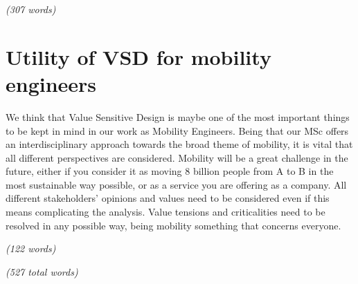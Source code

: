 \emph{(307 words)}

\section{Utility of VSD for mobility engineers}
\label{vsd}
We think that Value Sensitive Design is maybe one of the most important things to be kept in mind in our work as Mobility Engineers. Being that our MSc offers an interdisciplinary approach towards the broad theme of mobility, it is vital that all different perspectives are considered. Mobility will be a great challenge in the future, either if you consider it as moving 8 billion people from A to B in the most sustainable way possible, or as a service you are offering as a company. All different stakeholders’ opinions and values need to be considered even if this means complicating the analysis. Value tensions and criticalities need to be resolved in any possible way, being mobility something that concerns everyone.

\emph{(122 words)}

\emph{(527 total words)}

